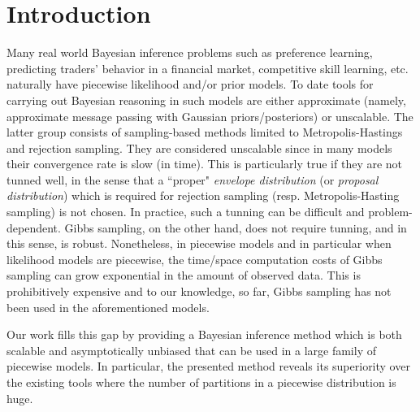 \section{Introduction}
Many real world Bayesian inference problems such as preference learning, predicting traders’ behavior in a financial market, competitive skill learning, etc. naturally have piecewise likelihood and/or prior models. To date tools for carrying out Bayesian reasoning in such models are either approximate (namely, approximate message passing with Gaussian priors/posteriors) or unscalable. The latter group consists of sampling-based methods limited to Metropolis-Hastings and rejection sampling. They are considered unscalable since in many models their convergence rate is slow (in time). 
This is particularly true if they are not tunned well, in the sense that 
a ``proper" \emph{envelope distribution} (or \emph{proposal distribution}) 
which is required for rejection sampling (resp. Metropolis-Hasting sampling) is not chosen.
In practice, such a tunning can be difficult and problem-dependent. 
Gibbs sampling, on the other hand, does not require tunning, and in this sense, is robust.
Nonetheless, in piecewise models and in particular when likelihood models are piecewise,
the time/space computation costs of Gibbs sampling can grow exponential in the amount of observed data.    This is prohibitively expensive 
and to our knowledge, so far, Gibbs sampling has not been used in the aforementioned models. 

Our work fills this gap by providing a Bayesian inference method which is both scalable and asymptotically unbiased that can be used in a large family of piecewise models. 
In particular, the presented method reveals its superiority over the existing tools where the number of partitions in a piecewise distribution is huge.    

